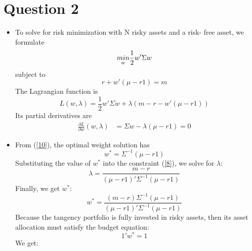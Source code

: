 \documentclass[UTF8]{ctexart}
\begin{document}
\section*{Question 2}
\begin{itemize}
	\item To solve for risk minimization with N risky assets and a risk- free asset, we formulate
	      \begin{equation}\notag
		      \underset{w}{min}\frac{1}{2}w'\Sigma w
	      \end{equation}
	      subject to
	      \begin{equation}\label{8}
		      r + w'(\mu - r1) = m
	      \end{equation}
	      The Lagrangian function is
	      \begin{equation}\label{9}
		      L(w,\lambda) = \frac{1}{2}w'\Sigma w + \lambda(m - r - w'(\mu - r1))
	      \end{equation}
	      Its partial derivatives are
	      \begin{equation}\label{10}
		      \begin{aligned}
			      \frac{\partial L}{\partial w}(w,\lambda) & = \Sigma w - \lambda (\mu - r1) = 0
		      \end{aligned}
	      \end{equation}
	\item From (\ref{10}), the optimal weight solution has
	      \begin{equation}\label{11}
		      w^* = \Sigma^{-1}(\mu - r1)
	      \end{equation}
	      Substituting the value of $w^*$ into the constraint (\ref{8}), we solve for $\lambda$:
	      \begin{equation}\label{12}
		      \lambda = \frac{m - r}{(\mu - r1)'\Sigma^{-1}(\mu - r1)}
	      \end{equation}
	      Finally, we get $w^*$:
	      \begin{equation}\label{13}
		      w^* = \frac{(m - r)\Sigma^{-1}(\mu - r1)}{(\mu - r1)'\Sigma^{-1}(\mu - r1)}
	      \end{equation}
	      Because the tangency portfolio is fully invested in risky assets, then its asset allocation must satisfy the budget equation:
	      \begin{equation}\label{14}
		      1'w^* = 1
	      \end{equation}
	      We get:
	      \begin{equation}\label{15}
		      \begin{aligned}

\end{aligned}
\end{equation}
\end{itemize}
\end{document}
